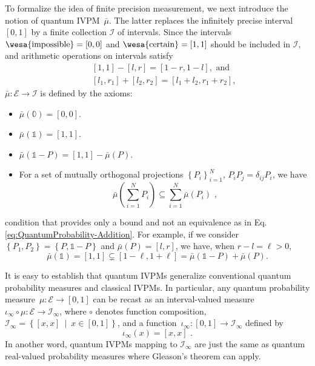 \documentclass[english,reprint, aps, prl,superscriptaddress, showpacs,
showkeys, longbibliography, amsmath, amssymb]{revtex4-1}
\theoremstyle{plain}
\theoremstyle{definition}
\newcommand{\events}{\ensuremath{\mathcal{E}}}
\newcommand{\imposs}{{\text{\wesa{impossible}}}}
\newcommand{\necess}{{\text{\wesa{certain}}}}
\newcommand{\set}[2]{\ensuremath{\left\{ {#1}~\middle|~{#2}\right\} }}
\begin{document}
To formalize the idea of finite precision measurement, we next introduce 
the notion of quantum IVPM~$\bar{\mu}$. The latter replaces 
the infinitely precise interval $[0,1]$ by a finite collection $\mathscr{I}$ of
intervals. Since the intervals $\imposs=\left[0,0\right]$ and $\necess=\left[1,1\right]$ 
should be included in $\mathscr{I}$, and arithmetic operations on intervals satisfy
\begin{subequations}\label{eq:interval-operations}
\begin{eqnarray}
 &  & \left[1,1\right]-\left[l,r\right]=\left[1-r,1-l\right], \textrm{ and}\\
 &  & [l_{1},r_{1}]+[l_{2},r_{2}]=[l_{1}+l_{2},r_{1}+r_{2}] ,
\end{eqnarray}
\end{subequations}
$\bar{\mu}:\events\rightarrow\mathscr{I}$ is defined by the axioms:
\begin{itemize}
\item $\bar{\mu}(\mathbb{0})=\left[0,0\right]$. 
\item $\bar{\mu}(\mathbb{1})=\left[1,1\right]$. 
\item $\bar{\mu}\left(\mathbb{1}-P\right)=\left[1,1\right]-\bar{\mu}\left(P\right)$. 
\item For a set of mutually orthogonal projections $\left\{ P_{i}\right\} _{i=1}^{N}$,
$P_{i}P_{j}=\delta_{ij}P_{i}$, we have 
\begin{equation}
\bar{\mu}\left(\sum_{i=1}^{N}P_{i}\right)\subseteq\sum_{i=1}^{N}\bar{\mu}\left(P_{i}\right)\textrm{ ,}\label{eq:QuantumInterval-valuedProbability-Inclusion}
\end{equation}
\end{itemize}
condition that provides only a bound and not an equivalence as in
Eq. \eqref{eq:QuantumProbability-Addition}. For example, if we consider
$\left\{ P_{1},P_{2}\right\} =\left\{ P,\mathbb{1}-P\right\} $ and
$\bar{\mu}\left(P\right)=\left[l,r\right]$, we have, when $r-l=\ell>0$,
\[
\bar{\mu}(\mathbb{1})=\left[1,1\right]\subsetneq\left[1-\ell,1+\ell\right]=\bar{\mu}\left(\mathbb{1}-P\right)+\bar{\mu}\left(P\right).
\]

It is easy to establish that quantum IVPMs generalize conventional
quantum probability measures and classical IVPMs. In particular, any
quantum probability measure~$\mu:\events\rightarrow\left[0,1\right]$
can be recast as an interval-valued measure~$\iota_{\infty}\circ\mu:\events\rightarrow\mathscr{I}_{\infty}$,
where $\circ$ denotes function composition, $\mathscr{I}_{\infty}=\set{\left[x,x\right]}{x\in\left[0,1\right]}$,
and a function~$\iota_{\infty}:\left[0,1\right]\rightarrow\mathscr{I}_{\infty}$
defined by 
\begin{equation}
\iota_{\infty}\left(x\right)=\left[x,x\right]\textrm{ .}\label{eq:iota_infty}
\end{equation}
In another word, quantum IVPMs mapping to $\mathscr{I}_{\infty}$
are just the same as quantum real-valued probability measures where
Gleason's theorem can apply.
\end{document}
